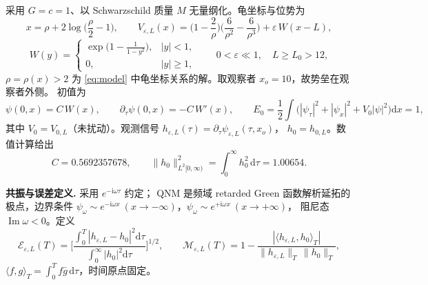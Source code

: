 \documentclass[11pt]{ctexart}
\theoremstyle{definition}
\newcommand{\dd}{\mathrm{d}}
\newcommand{\ii}{\mathrm{i}}
\newcommand{\Imw}{\operatorname{Im}\omega}
\begin{document}
采用 $G=c=1$、以 Schwarzschild 质量 $M$ 无量纲化。龟坐标与位势为
\begin{equation}
x=\rho+2\log\!\Big(\frac{\rho}{2}-1\Big),\qquad
V_{\varepsilon,L}(x)=\Big(1-\frac2\rho\Big)\Big(\frac6{\rho^2}-\frac6{\rho^3}\Big)
+\varepsilon\,W(x-L),
\label{eq:model}
\end{equation}
\[
W(y)=\begin{cases}\exp\!\big(1-\frac1{1-y^2}\big),&|y|<1,\\0,&|y|\ge1,\end{cases}\qquad
0<\varepsilon\ll1,\quad L\ge L_0>12 ,
\]
$\rho=\rho(x)>2$ 为 \eqref{eq:model} 中龟坐标关系的解。取观察者 $x_o=10$，故势垒在观察者外侧。
初值为
\begin{equation}
\psi(0,x)=C\,W(x),\qquad \partial_\tau\psi(0,x)=-C\,W'(x),\qquad
E_0=\frac12\!\int\!\big(|\psi_\tau|^2+|\psi_x|^2+V_0|\psi|^2\big)\dd x=1,
\label{eq:ic}
\end{equation}
其中 $V_0=V_{0,L}$（未扰动）。观测信号 $h_{\varepsilon,L}(\tau)=\partial_\tau\psi_{\varepsilon,L}(\tau,x_o)$，
$h_0=h_{0,L}$。数值计算给出
\begin{equation}
C=0.5692357678,\qquad \|h_0\|_{L^2[0,\infty)}^2=\int_0^\infty h_0^2\,\dd\tau=1.00654 .
\label{eq:Cnorm}
\end{equation}

\textbf{共振与误差定义.} 采用 $e^{-\ii\omega\tau}$ 约定；
QNM 是频域 retarded Green 函数解析延拓的极点，边界条件
$\psi_\omega\sim e^{-\ii\omega x}~(x\to-\infty)$，$\psi_\omega\sim e^{+\ii\omega x}~(x\to+\infty)$，
阻尼态 $\Imw<0$。定义
\begin{equation}
\mathcal E_{\varepsilon,L}(T)=\Big[\frac{\int_0^T|h_{\varepsilon,L}-h_0|^2\dd\tau}
{\int_0^\infty|h_0|^2\dd\tau}\Big]^{1/2},\qquad
\mathcal M_{\varepsilon,L}(T)=1-\frac{|\langle h_{\varepsilon,L},h_0\rangle_T|}
{\|h_{\varepsilon,L}\|_T\,\|h_0\|_T},
\label{eq:EM}
\end{equation}
$\langle f,g\rangle_T=\int_0^Tf\bar g\,\dd\tau$，时间原点固定。
\end{document}

